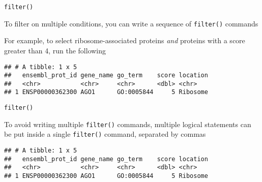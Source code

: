 \documentclass[ignorenonframetext,]{beamer}
\newenvironment{Shaded}{\begin{snugshade}}{\end{snugshade}}
\newcommand{\DecValTok}[1]{\textcolor[rgb]{0.00,0.00,0.81}{#1}}
\newcommand{\KeywordTok}[1]{\textcolor[rgb]{0.13,0.29,0.53}{\textbf{#1}}}
\newcommand{\NormalTok}[1]{#1}
\newcommand{\OperatorTok}[1]{\textcolor[rgb]{0.81,0.36,0.00}{\textbf{#1}}}
\newcommand{\StringTok}[1]{\textcolor[rgb]{0.31,0.60,0.02}{#1}}
\begin{document}
\begin{frame}[fragile]{\texttt{filter()}}
\protect\hypertarget{filter-3}{}

To filter on multiple conditions, you can write a sequence of
\texttt{filter()} commands

For example, to select ribosome-associated proteins \emph{and} proteins
with a score greater than 4, run the following

\begin{Shaded}
\end{Shaded}

\begin{verbatim}
## # A tibble: 1 x 5
##   ensembl_prot_id gene_name go_term    score location
##   <chr>           <chr>     <chr>      <dbl> <chr>   
## 1 ENSP00000362300 AGO1      GO:0005844     5 Ribosome
\end{verbatim}

\end{frame}

\begin{frame}[fragile]{\texttt{filter()}}
\protect\hypertarget{filter-4}{}

To avoid writing multiple \texttt{filter()} commands, multiple logical
statements can be put inside a single \texttt{filter()} command,
separated by commas

\begin{Shaded}
\end{Shaded}

\begin{verbatim}
## # A tibble: 1 x 5
##   ensembl_prot_id gene_name go_term    score location
##   <chr>           <chr>     <chr>      <dbl> <chr>   
## 1 ENSP00000362300 AGO1      GO:0005844     5 Ribosome
\end{verbatim}

\end{frame}
\end{document}
